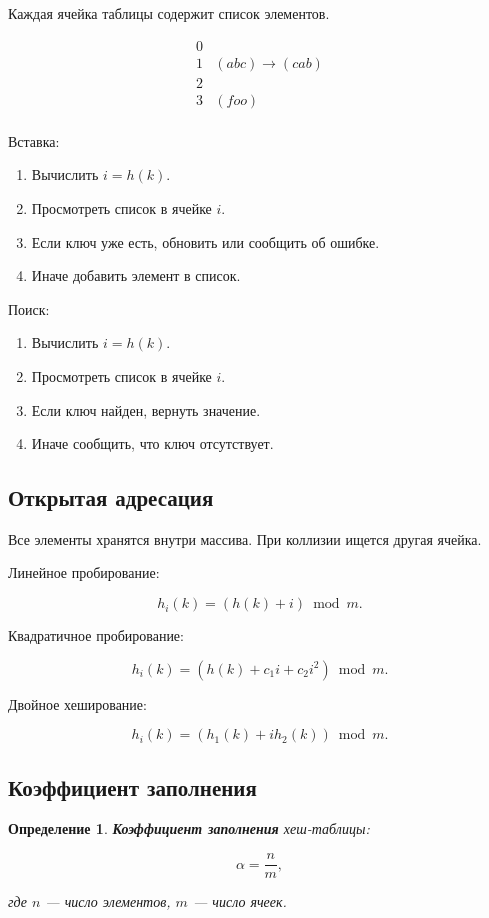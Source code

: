 \documentclass[12pt,a4paper]{article}
\newtheorem{definition}{Определение}
\begin{document}
Каждая ячейка таблицы содержит список элементов.

\[
\begin{array}{c|l}
0 & \\
1 & (abc) \to (cab) \\
2 & \\
3 & (foo) \\
\end{array}
\]

Вставка:

\begin{enumerate}
    \item Вычислить $i=h(k)$.
    \item Просмотреть список в ячейке $i$.
    \item Если ключ уже есть, обновить или сообщить об ошибке.
    \item Иначе добавить элемент в список.
\end{enumerate}

Поиск:

\begin{enumerate}
    \item Вычислить $i=h(k)$.
    \item Просмотреть список в ячейке $i$.
    \item Если ключ найден, вернуть значение.
    \item Иначе сообщить, что ключ отсутствует.
\end{enumerate}

\subsection{Открытая адресация}

Все элементы хранятся внутри массива. При коллизии ищется другая ячейка.

Линейное пробирование:

\[
h_i(k) = (h(k)+i)\bmod m.
\]

Квадратичное пробирование:

\[
h_i(k) = (h(k)+c_1i+c_2i^2)\bmod m.
\]

Двойное хеширование:

\[
h_i(k) = (h_1(k)+i h_2(k))\bmod m.
\]

\subsection{Коэффициент заполнения}

\begin{definition}
\textbf{Коэффициент заполнения} хеш-таблицы:

\[
\alpha=\frac{n}{m},
\]

где $n$ --- число элементов, $m$ --- число ячеек.
\end{definition}
\end{document}

